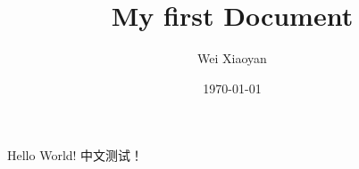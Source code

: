 \documentclass{article}%
\title{My first Document}
\author{Wei Xiaoyan}
\date{\today}
\begin{document}
    \maketitle
    Hello World!
    中文测试！
\end{document}
